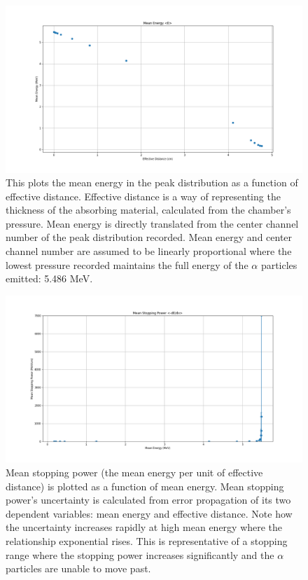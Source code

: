 \begin{figure}
\centering
\includegraphics[width=\textwidth]{mean_energy.png}
\caption{This plots the mean energy in the peak distribution as a function of effective distance. Effective distance is a way of representing the thickness of the absorbing material, calculated from the chamber’s pressure. Mean energy is directly translated from the center channel number of the peak distribution recorded. Mean energy and center channel number are assumed to be linearly proportional where the lowest pressure recorded maintains the full energy of the $\alpha$ particles emitted: 5.486 MeV.}
\label{fig:mean-energy}
\end{figure}

\begin{figure}
\centering
\includegraphics[width=\textwidth]{stopping_power.png}
\caption{Mean stopping power (the mean energy per unit of effective distance) is plotted as a function of mean energy. Mean stopping power’s uncertainty is calculated from error propagation of its two dependent variables: mean energy and effective distance. Note how the uncertainty increases rapidly at high mean energy where the relationship exponential rises. This is representative of a stopping range where the stopping power increases significantly and the $\alpha$ particles are unable to move past.}
\label{fig:stopping-power}
\end{figure}

